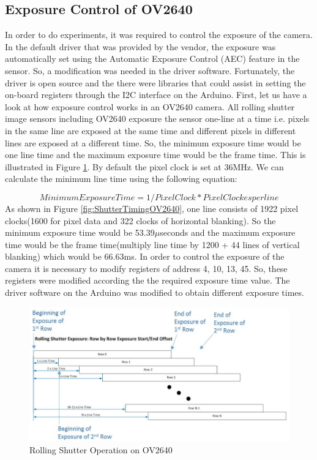 \subsection{Exposure Control of OV2640}
In order to do experiments, it was required to control the exposure of the camera. In the default driver that was provided by the vendor, the exposure was automatically set using the Automatic Exposure Control (AEC) feature in the sensor. So, a modification was needed in the driver software. Fortunately, the driver is open source and the there were libraries that could assist in setting the on-board registers through the I2C interface on the Arduino. First, let us have a look at how exposure control works in an OV2640 camera. All rolling shutter image sensors including OV2640 exposure the sensor one-line at a time i.e. pixels in the same line are exposed at the same time and different pixels in different lines are exposed at a different time. So, the minimum exposure time would be one line time and the maximum exposure time would be the frame time. This is illustrated in Figure \ref{fig:RollingShutterOV2640}. By default the pixel clock is set at 36MHz. We can calculate the minimum line time using the following equation:

$$
Minimum Exposure Time = 1/Pixel Clock * Pixel Clockes per line 
$$
As shown in Figure \ref{fig:ShutterTimingOV2640}, one line consists of 1922 pixel clocks(1600 for pixel data and 322 clocks of horizontal blanking). So the minimum exposure time would be 53.39$\mu$seconds and the maximum exposure time would be the frame time(multiply line time by 1200 + 44 lines of vertical blanking) which would be 66.63ms\cite{RollingShutterOV2640}. In order to control the exposure of the camera it is necessary to modify registers of address 4, 10, 13, 45. So, these registers were modified according the the required exposure time value. The driver software on the Arduino was modified to obtain different exposure times.
\begin{figure}[ht]
\includegraphics[width=\textwidth]{pics/rolling_shutter}
\caption{Rolling Shutter Operation on OV2640\cite{RollingShutterOV2640}}
\label{fig:RollingShutterOV2640}
\end{figure}

